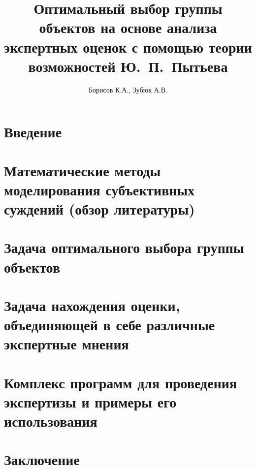 \documentclass{article}
\begin{document}

\thispagestyle{empty}			

\title{Оптимальный выбор группы объектов на основе анализа экспертных оценок с помощью теории возможностей Ю.~П.~Пытьева} 
\author{Борисов К.А., Зубюк А.В.}
\maketitle

\tableofcontents
\newpage

\section{Введение} 


\section{Математические методы моделирования субъективных суждений (обзор литературы)}
% 

\section{Задача оптимального выбора группы объектов}
% 

\section{Задача нахождения оценки, объединяющей в себе различные экспертные мнения}
% 

\section{Комплекс программ для проведения экспертизы и примеры его использования }
% 

\section{Заключение}
% 

\printbibliography[heading=bibintoc]
\end{document}
